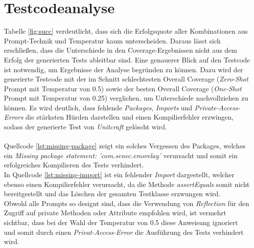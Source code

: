 \section{Testcodeanalyse}
Tabelle \ref{fig:succ} verdeutlicht, dass sich die Erfolgsquote aller Kombinationen aus Prompt-Technik und Temperatur kaum unterscheiden. Daraus lässt sich erschließen, dass die Unterschiede in den Coverage-Ergebnissen nicht aus dem Erfolg der generierten Tests ableitbar sind. Eine genauerer Blick auf den Testcode ist notwendig, um Ergebnisse der Analyse begründen zu können. Dazu wird der generierte Testcode mit der im Schnitt schlechtesten Overall Coverage (\textit{Zero-Shot} Prompt mit Temperatur von 0.5) sowie der besten Overall Coverage (\textit{One-Shot} Prompt mit Temperatur von 0.25) verglichen, um Unterschiede nachvollziehen zu können. Es wird deutlich, dass fehlende \textit{Packages}, \textit{Imports} und \textit{Private-Access-Errors} die stärksten Hürden darstellen und einen Kompilierfehler erzwingen, sodass der generierte Test von \textit{Unitcraft} gelöscht wird. \\\\
Quellcode \ref{lst:missing-package} zeigt ein solches Vergessen des Packages, welches ein \textit{Missing package statement: 'com.senec.emsrelay'} verursacht und somit ein erfolgreiches Kompilieren des Tests verhindert.\\

In Quellcode \ref{lst:missing-import} ist ein fehlender \textit{Import} dargestellt, welcher ebenso einen Kompilierfehler verursacht, da die Methode \textit{assertEquals} somit nicht bereitgestellt und das Löschen der gesamten Testklasse erzwungen wird.\\

Obwohl alle Prompts so designt sind, dass die Verwendung von \textit{Reflection} für den Zugriff auf private Methoden oder Attribute empfohlen wird, ist vermehrt sichtbar, dass bei der Wahl der Temperatur von 0.5 diese Anweisung ignoriert und somit durch einen \textit{Privat-Access-Error} die Ausführung des Tests verhindert wird.\\

